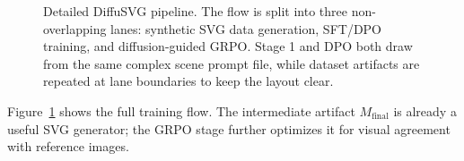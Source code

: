 \documentclass[10pt,twocolumn]{article}
\begin{document}
\begin{figure}[t]
{}
\caption{Detailed DiffuSVG pipeline. The flow is split into three non-overlapping
lanes: synthetic SVG data generation, SFT/DPO training, and diffusion-guided
GRPO. Stage 1 and DPO both draw from the same complex scene prompt file, while
dataset artifacts are repeated at lane boundaries to keep the layout clear.}
\label{fig:pipeline}
\end{figure}

Figure~\ref{fig:pipeline} shows the full training flow. The intermediate
artifact \(M_{\mathrm{final}}\) is already a useful SVG generator; the GRPO
stage further optimizes it for visual agreement with reference images.
\end{document}

